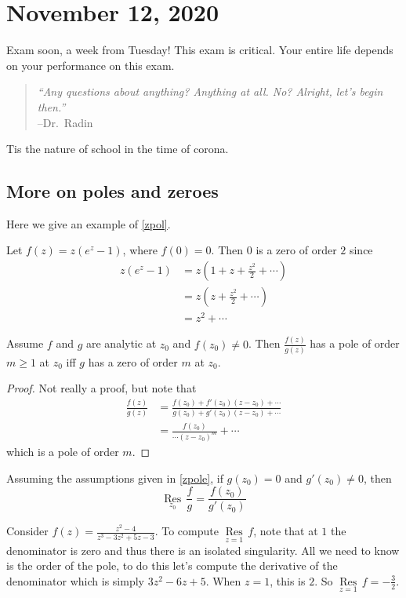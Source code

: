 \section{November 12, 2020}
Exam soon, a week from Tuesday! This exam is critical. Your entire life depends on your performance on this exam.
\begin{quote}
    \emph{``Any questions about anything? Anything at all. No? Alright, let's begin then.''}
    \\
    –Dr.\ Radin
\end{quote}
Tis the nature of school in the time of corona. 

\subsection{More on poles and zeroes}
Here we give an example of \cref{zpol}.
\begin{example}
    Let $f(z)=z(e^z-1)$, where $f(0)=0$. Then $0$ is a zero of order $2$ since 
    \begin{align*}
        z(e^z-1)&=z\left( 1+z+\frac{z^2}{2}+\cdots  \right) \\
                &=z\left(z+\frac{z^2}{2}+\cdots \right)\\
                &=z^2+\cdots 
    \end{align*}
\end{example}
\begin{theorem}\label{zpole}
    Assume $f$ and $g$ are analytic at $z_0$ and $f(z_0)\neq 0$. Then $\frac{f(z)}{g(z)}$ has a pole of order $m\geq 1$ at $z_0$ iff $g$ has a zero of order $m$ at $z_0$.
\end{theorem}
\begin{proof}
    Not really a proof, but note that 
    \begin{align*}
        \frac{f(z)}{g(z)}&=\frac{f(z_0)+f'(z_0)(z-z_0)+\cdots }{g(z_0)+g'(z_0)(z-z_0)+\cdots }\\
                         &=\frac{f(z_0)}{\cdots (z-z_0)^m}+\cdots 
    \end{align*}which is a pole of order $m$.
\end{proof}
\begin{cor}
    Assuming the assumptions given in \cref{zpole}, if $g(z_0)=0$ and $g'(z_0)\neq 0$, then \[
        \underset{z_0}{\operatorname{R es}} \,\frac{f}{g}= \frac{f(z_0)}{g'(z_0)}
    \]  
\end{cor}
\begin{example}
    Consider $f(z)=\frac{z^2-4}{z^3-3z^2+5z-3}$. To compute $\underset{z=1}{\operatorname{R es}} \, f$, note that at $1$ the denominator is zero and thus there is an isolated singularity. All we need to know is the order of the pole, to do this let's compute the derivative of the denominator which is simply $3z^2-6z+5$. When $z=1$, this is $2$. So $\underset{z=1}{\operatorname{R es}} \, f=-\frac{3}{2}$.
\end{example}
